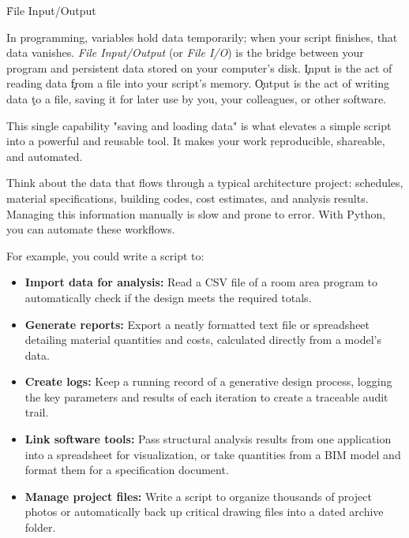
\h{File Input/Output}

In programming, variables hold data temporarily; when your script finishes, that data vanishes. \emph{File Input/Output} (or \emph{File I/O}) is the bridge between your program and persistent data stored on your computer's disk. \c{Input} is the act of reading data \c{from} a file into your script's memory. \c{Output} is the act of writing data \c{to} a file, saving it for later use by you, your colleagues, or other software.

This single capability "saving and loading data" is what elevates a simple script into a powerful and reusable tool. It makes your work \c{reproducible, shareable, and automated}.


Think about the data that flows through a typical architecture project: schedules, material specifications, building codes, cost estimates, and analysis results. Managing this information manually is slow and prone to error. With Python, you can automate these workflows.

For example, you could write a script to:
\begin{itemize}
  \item \textbf{Import data for analysis:} Read a CSV file of a room area program to automatically check if the design meets the required totals.
  \item \textbf{Generate reports:} Export a neatly formatted text file or spreadsheet detailing material quantities and costs, calculated directly from a model's data.
  \item \textbf{Create logs:} Keep a running record of a generative design process, logging the key parameters and results of each iteration to create a traceable audit trail.
  \item \textbf{Link software tools:} Pass structural analysis results from one application into a spreadsheet for visualization, or take quantities from a BIM model and format them for a specification document.
  \item \textbf{Manage project files:} Write a script to organize thousands of project photos or automatically back up critical drawing files into a dated archive folder.
\end{itemize}

